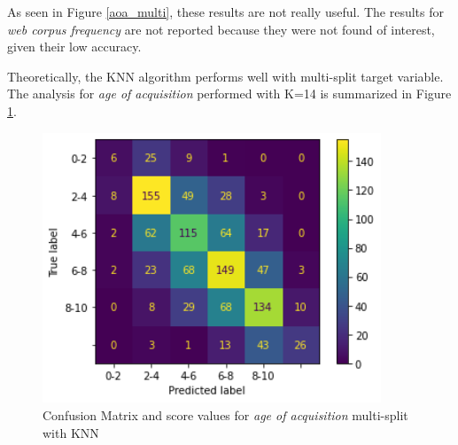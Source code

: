 \documentclass[a4paper,11pt,dvipsnames]{article}
\begin{document}
As seen in Figure \ref{aoa_multi}, these results are not really useful. The results for \textit{web corpus frequency} are not reported because they were not found of interest, given their low accuracy. 

Theoretically, the KNN algorithm performs well with multi-split target variable. The analysis for \textit{age of acquisition} performed with K=14 is summarized in Figure \ref{aoa_multi_KNN}.

\begin{figure}[h]
  \begin{minipage}{.37\linewidth}
    \centering
    \includegraphics[width=0.9\textwidth]{aoa_multi_knn_matrix.png}%
  \end{minipage}
  \hfil
  \begin{minipage}{.5\linewidth}
    \centering

  \end{minipage}
  
  \caption{Confusion Matrix and score values for \textit{age of acquisition} multi-split with KNN} \label{aoa_multi_KNN}
\end{figure}
\end{document}
